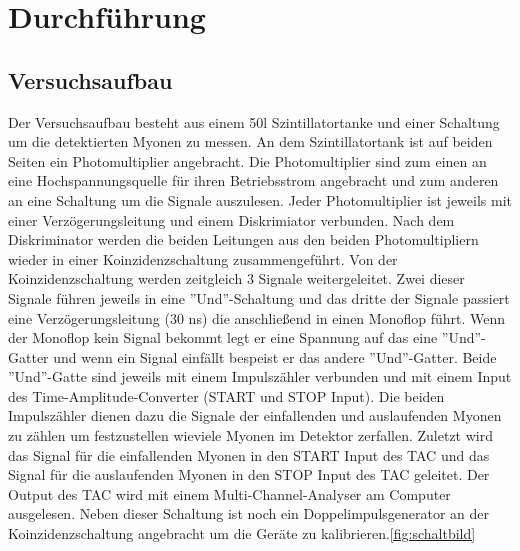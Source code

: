 \section{Durchführung}
\label{sec:Durchfuehrung}
\subsection{Versuchsaufbau}
Der Versuchsaufbau besteht aus einem 50l Szintillatortanke und einer Schaltung um die detektierten Myonen zu messen.
An dem Szintillatortank ist auf beiden Seiten ein Photomultiplier angebracht.
Die Photomultiplier sind zum einen an eine Hochspannungsquelle für ihren Betriebsstrom angebracht und zum anderen an eine Schaltung um die Signale auszulesen.
Jeder Photomultiplier ist jeweils mit einer Verzögerungsleitung und einem Diskrimiator verbunden.
Nach dem Diskriminator werden die beiden Leitungen aus den beiden Photomultipliern wieder in einer Koinzidenzschaltung zusammengeführt.
Von der Koinzidenzschaltung werden zeitgleich 3 Signale weitergeleitet.
Zwei dieser Signale führen jeweils in eine ''Und''-Schaltung und das dritte der Signale passiert eine Verzögerungsleitung (30 ns) die anschließend in einen Monoflop führt.
Wenn der Monoflop kein Signal bekommt legt er eine Spannung auf das eine ''Und''-Gatter und wenn ein Signal einfällt bespeist er das andere ''Und''-Gatter.
Beide ''Und''-Gatte sind jeweils mit einem Impulszähler verbunden und mit einem Input des Time-Amplitude-Converter (START und STOP Input).
Die beiden Impulszähler dienen dazu die Signale der einfallenden und auslaufenden Myonen zu zählen um festzustellen wieviele Myonen im Detektor zerfallen.
Zuletzt wird das Signal für die einfallenden Myonen in den START Input des TAC und das Signal für die auslaufenden Myonen in den STOP Input des TAC geleitet.
Der Output des TAC wird mit einem Multi-Channel-Analyser am Computer ausgelesen.
Neben dieser Schaltung ist noch ein Doppelimpulsgenerator an der Koinzidenzschaltung angebracht um die Geräte zu kalibrieren.\ref{fig:schaltbild}
